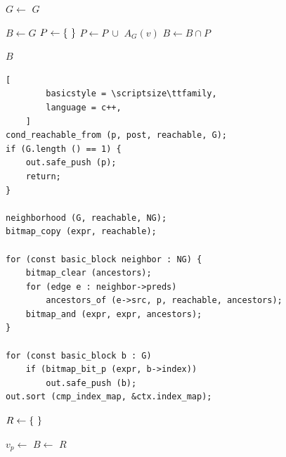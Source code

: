 \documentclass[xcolor = {dvipsnames, table}, aspectratio=169]{beamer}
\begin{document}
\begin{frame}
    \begin{algorithmic}[1]
            \State $G \gets$ 
                \State \Return $G$
            \EndIf

            \State $B \gets G$
                \State $P \gets \set{}$
                    \State $P \gets P\ \cup$ $A_G(v)$
                \EndFor
                \State $B \gets B \cap P$
            \EndFor

            \State \Return $B$
        \EndFunction
    \end{algorithmic}
\end{frame}

\begin{frame}[fragile]
    \begin{lstlisting}[
        basicstyle = \scriptsize\ttfamily,
        language = c++,
    ]
cond_reachable_from (p, post, reachable, G);
if (G.length () == 1) {
    out.safe_push (p);
    return;
}

neighborhood (G, reachable, NG);
bitmap_copy (expr, reachable);

for (const basic_block neighbor : NG) {
    bitmap_clear (ancestors);
    for (edge e : neighbor->preds)
        ancestors_of (e->src, p, reachable, ancestors);
    bitmap_and (expr, expr, ancestors);
}

for (const basic_block b : G)
    if (bitmap_bit_p (expr, b->index))
        out.safe_push (b);
out.sort (cmp_index_map, &ctx.index_map);
    \end{lstlisting}
\end{frame}

\begin{frame}
    \begin{algorithmic}[1]
            \State $R \gets \set{}$


                    \State $v_p \gets$ 
                    \State $B \gets$ 
                    \State {}
                    \State {}
                \Else
                    \State {}
                \EndIf
            \EndFor
            \State \Return $R$
        \EndFunction
    \end{algorithmic}
\end{frame}
\end{document}
